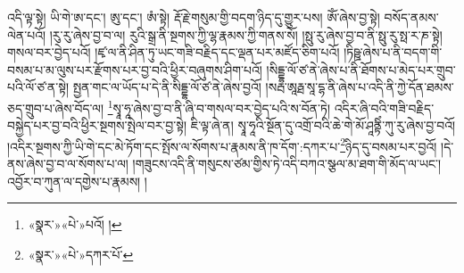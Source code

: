 འདི་ལྟ་སྟེ། ཡི་གེ་ཨ་དང་། ཨུ་དང་། ཨཾ་སྟེ། རྡོ་རྗེ་གསུམ་གྱི་བདག་ཉིད་དུ་གྱུར་པས། ཨོཾ་ཞེས་བྱ་སྟེ། བསོད་ནམས་ལེན་པའོ། །རུ་རུ་ཞེས་བྱ་བ་ལ། རུའི་སྒྲ་ནི་སྔགས་ཀྱི་ལྷ་རྣམས་ཀྱི་གནས་སོ། །སྥུ་རུ་ཞེས་བྱ་བ་ནི་སྥུ་རུ་སྥ་ར་ཎ་སྟེ། གསལ་བར་བྱེད་པའོ། །ཛྭ་ལ་ནི་ཤིན་ཏུ་ཡང་གཟི་བརྗིད་དང་ལྡན་པར་མཛོད་ཅིག་པའོ། །ཏིཥྛ་ཞེས་པ་ནི་བདག་གི་བསམ་པ་མ་ལུས་པར་རྫོགས་པར་བྱ་བའི་ཕྱིར་བཞུགས་ཤིག་པའོ། །སིདྡྷ་ལོ་ཙ་ནེ་ཞེས་པ་ནི་ཐོགས་པ་མེད་པར་གྲུབ་པའི་ལོ་ཙ་ན་སྟེ། སྤྱན་གང་ལ་ཡོད་པ་དེ་ནི་སིདྡྷ་ལོ་ཙ་ནེ་ཞེས་བྱའོ། །སརྦ་ཨཱརྠ་སཱ་དྷ་ནི་ཞེས་པ་འདི་ནི་ཀྱེ་དོན་ཐམས་ཅད་གྲུབ་པ་ཞེས་བོད་ལ། \footnote{«སྣར་»«པེ་»པའོ། ། }སྭཱ་ཧཱ་ཞེས་བྱ་བ་ནི་ཞི་བ་གསལ་བར་བྱེད་པའི་ས་བོན་ཏེ། འདིར་ཞི་བའི་གཟི་བརྗིད་བསྐྱེད་པར་བྱ་བའི་ཕྱིར་སྔགས་སྤེལ་བར་བྱ་སྟེ། ཇི་ལྟ་ཞེ་ན། སྭཱ་ཧཱའི་སྔོན་དུ་འགྲོ་བའི་ཆེ་གེ་མོ་ཤཱནྟིཾ་ཀུ་རུ་ཞེས་བྱ་བའོ། །འདིར་སྔགས་ཀྱི་ཡི་གེ་དང་མེ་ཏོག་དང་སྤོས་ལ་སོགས་པ་རྣམས་ནི་ཁ་དོག་:དཀར་པ་\footnote{«སྣར་»«པེ་»དཀར་པོ་}ཉིད་དུ་བསམ་པར་བྱའོ། །དེ་ནས་ཞེས་བྱ་བ་ལ་སོགས་པ་ལ། །གཟུངས་འདི་ནི་གསུངས་ཙམ་གྱིས་ཏེ་འདི་བཀའ་སྩལ་མ་ཐག་གི་མོད་ལ་ཡང་། འབྱོར་བ་ཀུན་ལ་དགྱེས་པ་རྣམས། །
